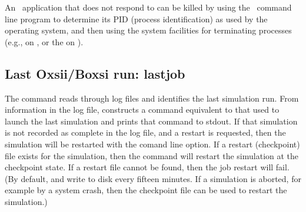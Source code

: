 An \OOMMF\ application that does not respond to  can be
killed by using the \OOMMF\ command line program
 to
determine its PID (process identification) as used by the operating
system, and then using the system facilities for terminating processes
(e.g.,  on \Unix, or the  on
\Windows).


\subsection{Last Oxsii/Boxsi run:
            lastjob\label{sec:lastjob}}%

The  command reads through
log files and identifies
the last simulation run.  From information in the log file,
 constructs a command equivalent to that used to launch
the last simulation and prints that command to stdout.  If that
simulation is not recorded as complete in the log file, and a restart is
requested, then the simulation will be restarted with the
 comand line option.  If a restart
(checkpoint) file exists for the simulation, then the command will
restart the simulation at the checkpoint state.  If a restart file
cannot be found, then the job restart will fail.
(By default,  and  write
%
to disk every fifteen minutes.  If a simulation is aborted, for example
by a system crash, then the checkpoint file can be used to restart the
simulation.)

